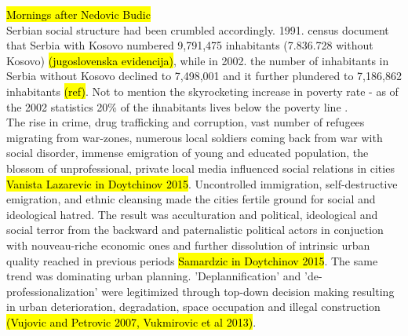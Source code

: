 \documentclass[11pt]{report}
\begin{document}
\hl{Mornings after Nedovic Budic}
\\
Serbian social structure had been crumbled accordingly. 1991. census document that Serbia with Kosovo numbered 9,791,475 inhabitants (7.836.728 without Kosovo) \hl{(jugoslovenska evidencija)}, while in 2002. the number of inhabitants in Serbia without Kosovo declined to 7,498,001 and it further plundered to 7,186,862 inhabitants \hl{(ref)}.
Not to mention the skyrocketing increase in poverty rate - as of the 2002 statistics 20\% of the ihnabitants lives below the poverty line 
\cite{Vladina strategija za smanjenje siromastva}.
\\
The rise in crime, drug trafficking and corruption, vast number of refugees migrating from war-zones, numerous local soldiers coming back from war with social disorder, immense emigration of young and educated population, the blossom of unprofessional, private local media influenced social relations in cities \hl{Vanista Lazarevic in Doytchinov 2015}. Uncontrolled immigration, self-destructive emigration,  and ethnic cleansing made the cities fertile ground for social and ideological hatred. The result was acculturation and political, ideological and social terror from the backward and paternalistic political actors in conjuction with nouveau-riche economic ones and further dissolution of intrinsic urban quality reached in previous periods \hl{Samardzic in Doytchinov 2015}.
The same trend was dominating urban planning. 'Deplannification' and 'de-professionalization' were legitimized through top-down decision making resulting in urban deterioration, degradation, space occupation and illegal construction \hl{(Vujovic and Petrovic 2007, Vukmirovic et al 2013)}.
\\
\end{document}
